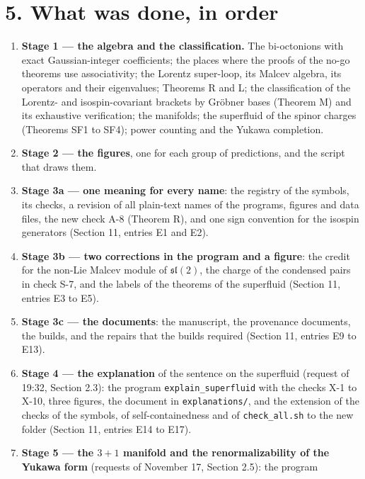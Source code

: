 \documentclass[
  10pt,
]{article}
\begin{document}
\hypertarget{what-was-done-in-order}{%
\section{5. What was done, in order}\label{what-was-done-in-order}}

\begin{enumerate}
\def\labelenumi{\arabic{enumi}.}
\item
  \textbf{Stage 1 --- the algebra and the classification.} The
  bi-octonions with exact Gaussian-integer coefficients; the places
  where the proofs of the no-go theorems use associativity; the Lorentz
  super-loop, its Malcev algebra, its operators and their eigenvalues;
  Theorems R and L; the classification of the Lorentz- and
  isospin-covariant brackets by Gröbner bases (Theorem M) and its
  exhaustive verification; the manifolds; the superfluid of the spinor
  charges (Theorems SF1 to SF4); power counting and the Yukawa
  completion.
\item
  \textbf{Stage 2 --- the figures}, one for each group of predictions,
  and the script that draws them.
\item
  \textbf{Stage 3a --- one meaning for every name}: the registry of the
  symbols, its checks, a revision of all plain-text names of the
  programs, figures and data files, the new check A-8 (Theorem R), and
  one sign convention for the isospin generators (Section 11, entries E1
  and E2).
\item
  \textbf{Stage 3b --- two corrections in the program and a figure}: the
  credit for the non-Lie Malcev module of \(\mathfrak{sl}(2)\), the
  charge of the condensed pairs in check S-7, and the labels of the
  theorems of the superfluid (Section 11, entries E3 to E5).
\item
  \textbf{Stage 3c --- the documents}: the manuscript, the provenance
  documents, the builds, and the repairs that the builds required
  (Section 11, entries E9 to E13).
\item
  \textbf{Stage 4 --- the explanation} of the sentence on the superfluid
  (request of 19:32, Section 2.3): the program
  \texttt{explain\_superfluid} with the checks X-1 to X-10, three
  figures, the document in \texttt{explanations/}, and the extension of
  the checks of the symbols, of self-containedness and of
  \texttt{check\_all.sh} to the new folder (Section 11, entries E14 to
  E17).
\item
  \textbf{Stage 5 --- the \(3+1\) manifold and the renormalizability of
  the Yukawa form} (requests of November 17, Section 2.5): the program

\end{enumerate}
\end{document}
